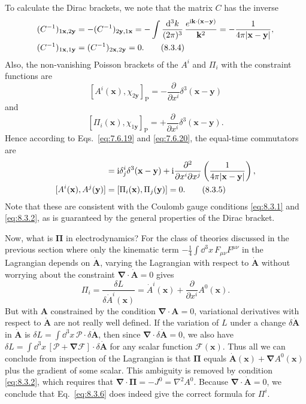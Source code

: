 To calculate the Dirac brackets, we note that the matrix $C$ has the inverse
\begin{align}
  (C^{-1})_{1\mathbf x,2\mathbf y}
  &=-(C^{-1})_{2\mathbf y,1\mathbf x}
  =-\int\frac{\mathop{}\!\mathrm{d}^3k}{(2\pi)^3}\,
  \frac{e^{\mathrm{i}\mathbf k\cdot(\mathbf x-\mathbf y)}}{\mathbf k^2}
  =-\frac{1}{4\pi\lvert\mathbf x-\mathbf y\rvert},
  \notag\\
  (C^{-1})_{1\mathbf x,1\mathbf y}
  &=(C^{-1})_{2\mathbf x,2\mathbf y}=0.
  \tag{8.3.4}\label{eq:8.3.4}
\end{align}
Also, the non-vanishing Poisson brackets of the $A^i$ and $\Pi_i$ with the
constraint functions are
\[
  [A^i(\mathbf x),\chi_{2\mathbf y}]_{\mathrm P}
  =-\frac{\partial}{\partial x^i}\delta^3(\mathbf x-\mathbf y)
\]
and
\[
  [\Pi_i(\mathbf x),\chi_{1\mathbf y}]_{\mathrm P}
  =+\frac{\partial}{\partial x^i}\delta^3(\mathbf x-\mathbf y).
\]
Hence according to Eqs.~\eqref{eq:7.6.19} and \eqref{eq:7.6.20}, the equal-time commutators are
\begin{align}
  [A^i(\mathbf x),\Pi_j(\mathbf y)]
  &=\ii\delta^i_j\delta^3(\mathbf x-\mathbf y)
  +\ii\frac{\partial^2}{\partial x^i\partial x^j}
  \left(\frac{1}{4\pi\lvert\mathbf x-\mathbf y\rvert}\right),
  \notag\\
  [A^i(\mathbf x),A^j(\mathbf y)]
  &=[\Pi_i(\mathbf x),\Pi_j(\mathbf y)]=0.
  \tag{8.3.5}\label{eq:8.3.5}
\end{align}
Note that these are consistent with the Coulomb gauge conditions \eqref{eq:8.3.1}
and \eqref{eq:8.3.2}, as is guaranteed by the general properties of the Dirac bracket.

Now, what is $\boldsymbol\Pi$ in electrodynamics? For the class of theories
discussed in the previous section where only the kinematic term
$-\tfrac14\int \dd^3x\,F_{\mu\nu}F^{\mu\nu}$ in the Lagrangian depends on
$\dot{\mathbf A}$, varying the Lagrangian with respect to $\dot{\mathbf A}$
without worrying about the constraint
$\boldsymbol\nabla\cdot\dot{\mathbf A}=0$ gives
\begin{equation}
  \Pi_i=\frac{\delta L}{\delta\dot A^i(\mathbf x)}
  =\dot A^i(\mathbf x)+\frac{\partial}{\partial x^i}A^0(\mathbf x).
  \tag{8.3.6}\label{eq:8.3.6}
\end{equation}
But with $\mathbf A$ constrained by the condition
$\boldsymbol\nabla\cdot\mathbf A=0$, variational derivatives with respect to
$\dot{\mathbf A}$ are not really well defined. If the variation of $L$ under a
change $\delta\dot{\mathbf A}$ in $\dot{\mathbf A}$ is
$\delta L=\int \dd^3x\,\boldsymbol{\mathcal P}\cdot\delta\dot{\mathbf A}$, then
since $\boldsymbol\nabla\cdot\delta\dot{\mathbf A}=0$, we also have
$\delta L=\int \dd^3x\,[\boldsymbol{\mathcal P}+\boldsymbol\nabla\mathcal F]
\cdot\delta\dot{\mathbf A}$ for any scalar function $\mathcal F(\mathbf x)$.
Thus all we can conclude from inspection of the Lagrangian is that
$\boldsymbol\Pi$ equals
$\dot{\mathbf A}(\mathbf x)+\boldsymbol\nabla A^0(\mathbf x)$ plus the gradient
of some scalar. This ambiguity is removed by condition \eqref{eq:8.3.2}, which requires
that $\boldsymbol\nabla\cdot\boldsymbol\Pi=-J^0=\nabla^2A^0$. Because
$\boldsymbol\nabla\cdot\dot{\mathbf A}=0$, we conclude that Eq.~\eqref{eq:8.3.6} does
indeed give the correct formula for $\Pi^i$.

